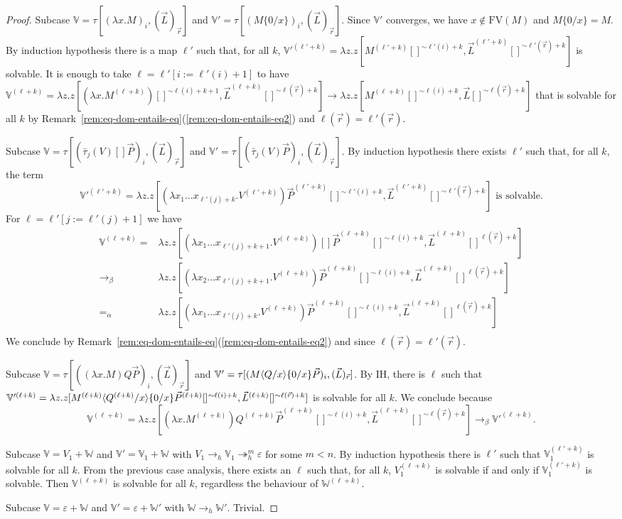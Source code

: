 \documentclass{LMCS}
\newcommand{\lam}{\ensuremath{\lambda}}
\newcommand{\FV}{\mathrm{FV}}
\newcommand{\msto}{\twoheadrightarrow}
\newcommand{\subst}[2]{\{ #2 / #1 \}}	\newcommand{\dg}[2]{\mathrm{deg}_{#1}(#2)} \newcommand{\obsle}{\sqsubseteq_{\mathcal{O}}}
\newcommand{\seq}[1]{\vec{#1}}
\newcommand{\sV}{\mathbb{V}}
\newcommand{\sW}{\mathbb{W}}
\newcommand{\gt}{\ensuremath{\tau}}
\newcommand{\gto}{\ensuremath{\bar\tau}}
\begin{document}
\begin{proof}
Subcase $\sV = \gt [(\lam x. M)_i, (\seq L)_{\seq r}]$ and $\sV' = \gt[(M\subst{x}{0})_i,(\seq L)_{\seq r}]$.
Since $\sV'$ converges, we have $x\notin\FV(M)$ and $M\subst{x}{0} = M$.
By induction hypothesis there is a map $\ell'$ such that, for all $k$,  $\sV'^{(\ell'+k)} = \lam z.z[ M^{(\ell'+k)}[]^{\sim\ell'(i)+k}, \seq L^{(\ell'+k)}[]^{\sim \ell'(\seq r) + k}]$ is solvable.
It is enough to take $\ell = \ell'[i:=\ell'(i) + 1]$ to have $\sV^{(\ell+k)} = \lam z.z[(\lam x. M^{(\ell+k)})[]^{\sim\ell(i)+k+1}, \seq L^{(\ell+k)}[]^{\sim\ell(\seq r)+k}]\to
\lam z.z[M^{(\ell+k)}[]^{\sim\ell(i)+k}, \seq L []^{\sim\ell(\seq r)+k}]$ that is solvable for all $k$ by Remark~\ref{rem:eq-dom-entails-eq}(\ref{rem:eq-dom-entails-eq2})
and $\ell(\seq r) = \ell'(\seq r)$.

Subcase $\sV = \gt[(\gto_j(V)[]\seq P)_i,(\seq L)_{\seq r}]$ and $\sV' = \gt[(\gto_j(V)\seq P)_{i},(\seq L)_{\seq r}]$.
By induction hypothesis there exists $\ell'$ such that,  for all $k$, the term 
$$ 
	\sV'^{(\ell'+k)} = \lam z.z[(\lam x_1\ldots x_{\ell'(j) + k}. V^{(\ell'+k)})\seq P^{(\ell'+k)}[]^{\sim\ell'(i)+k},\seq L^{(\ell'+k)}[]^{\sim\ell'(\seq r)+k}]\textrm{ is solvable.}
$$
For $\ell = \ell'[j:= \ell'(j)+1]$ we have 
$$
	\begin{array}{rl}
	\sV^{(\ell+k)} = &\lam z.z[(\lam x_1\ldots x_{\ell'(j) + k + 1}.V^{(\ell+k)})[]\seq P^{(\ell+k)}[]^{\sim\ell(i)+k},\seq L^{(\ell+k)}[]^{\ell(\seq r)+k}]\\
	\to_\beta&\lam z.z[(\lam x_2\ldots x_{\ell'(j) + k + 1}. V^{(\ell+k)})\seq P^{(\ell+k)}[]^{\sim\ell(i)+k},\seq L^{(\ell+k)}[]^{\ell(\seq r)+k}]\\
	=_{\alpha}&\lam z.z[(\lam x_1\ldots x_{\ell'(j) + k}. V^{(\ell+k)})\seq P^{(\ell+k)}[]^{\sim\ell(i)+k},\seq L^{(\ell+k)}[]^{\ell(\seq r)+k}]\\	
	\end{array}
$$
We conclude by Remark~\ref{rem:eq-dom-entails-eq}(\ref{rem:eq-dom-entails-eq2}) and since $\ell(\seq r) = \ell'(\seq r)$.

Subcase $\sV = \gt[((\lam x.M)Q\seq P)_i,(\seq L)_{\seq r}]$ and $\sV' = \gt[(M\lsubst{x}{Q}\subst{x}{0}\seq P)_i,(\seq L)_{\seq r}]$.
By IH, there is $\ell$ such that $\sV'^{(\ell+k)}
= \lam z.z[M^{(\ell+k)}\lsubst{x}{Q^{(\ell+k)}}\subst{x}{0}\seq P^{(\ell+k)}[]^{\sim\ell(i)+k},\seq L^{(\ell+k)}[]^{\sim\ell(\seq r)+k}]$ is solvable for all $k$. 
We conclude because 
$$
	\sV^{(\ell+k)} = \lam z.z[(\lam x.M^{(\ell+k)})Q^{(\ell+k)}\seq P^{(\ell+k)}[]^{\sim\ell(i)+k},\seq L^{(\ell+k)}[]^{\sim\ell(\seq r)+k}] \to_\beta \sV'^{(\ell+k)}.
$$

Subcase $\sV = V_1+\sW$ and $\sV' = \sV_1+\sW$ with $V_1\to_h \sV_1\msto_h^m\varepsilon$ for some $m<n$. 
By induction hypothesis there is $\ell'$ such that $\sV_1^{(\ell' + k)}$ is solvable for all $k$.
From the previous case analysis, there exists an $\ell$ such that,  for all $k$, $V_1^{(\ell + k)}$ is solvable if and only if $\sV_1^{(\ell' + k)}$ is solvable.
Then $\sV^{(\ell + k)}$ is solvable for all $k$, regardless the behaviour of $\sW^{(\ell+k)}$.

Subcase $\sV = \varepsilon+\sW$ and $\sV' = \varepsilon+\sW'$ with $\sW\to_h \sW'$. Trivial.
\end{proof}
\end{document}
